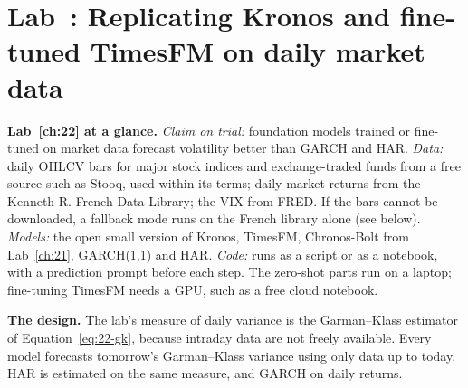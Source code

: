 \section{Lab~\thechapter: Replicating Kronos and fine-tuned TimesFM on daily market data}
\label{sec:22-lab}

\begin{callout}
\textbf{Lab~\ref{ch:22} at a glance.} \emph{Claim on trial:} foundation models trained or fine-tuned on market data forecast volatility better than GARCH and HAR. \emph{Data:} daily OHLCV bars for major stock indices and exchange-traded funds from a free source such as Stooq, used within its terms; daily market returns from the Kenneth R. French Data Library; the VIX from FRED. If the bars cannot be downloaded, a fallback mode runs on the French library alone (see below). \emph{Models:} the open small version of Kronos, TimesFM, Chronos-Bolt from Lab~\ref{ch:21}, GARCH(1,1) and HAR. \emph{Code:} runs as a script or as a notebook, with a prediction prompt before each step. The zero-shot parts run on a laptop; fine-tuning TimesFM needs a GPU, such as a free cloud notebook.
\end{callout}

\textbf{The design.} The lab's measure of daily variance is the Garman--Klass estimator of Equation~\eqref{eq:22-gk}, because intraday data are not freely available. Every model forecasts tomorrow's Garman--Klass variance using only data up to today. HAR is estimated on the same measure, and GARCH on daily returns.

